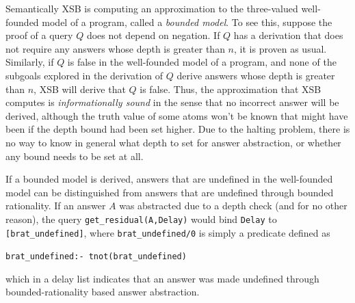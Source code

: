 Semantically XSB is computing an approximation to the three-valued
well-founded model of a program, called a {\em bounded model}.  To see
this, suppose the proof of a query $Q$ does not depend on negation.
If $Q$ has a derivation that does not require any answers whose depth
is greater than $n$, it is proven as usual.  Similarly, if $Q$ is
false in the well-founded model of a program, and none of the subgoals
explored in the derivation of $Q$ derive answers whose depth is
greater than $n$, XSB will derive that $Q$ is false.  Thus, the
approximation that XSB computes is {\em informationally sound} in the
sense that no incorrect answer will be derived, although the truth
value of some atoms won't be known that might have been if the depth
bound had been set higher.  Due to the halting problem, there is no
way to know in general what depth to set for answer abstraction, or
whether any bound needs to be set at all.

If a bounded model is derived, answers that are undefined in the
well-founded model can be distinguished from answers that are
undefined through bounded rationality.  If an answer $A$ was
abstracted due to a depth check (and for no other reason), the query
{\tt get\_residual(A,Delay)} would bind {\tt Delay} to {\tt
  [brat\_undefined]}, where {\tt brat\_undefined/0} is simply a
predicate defined as

{\tt brat\_undefined:- tnot(brat\_undefined)}

\noindent
which in a delay list indicates that an answer was made undefined
through bounded-rationality based answer abstraction.

